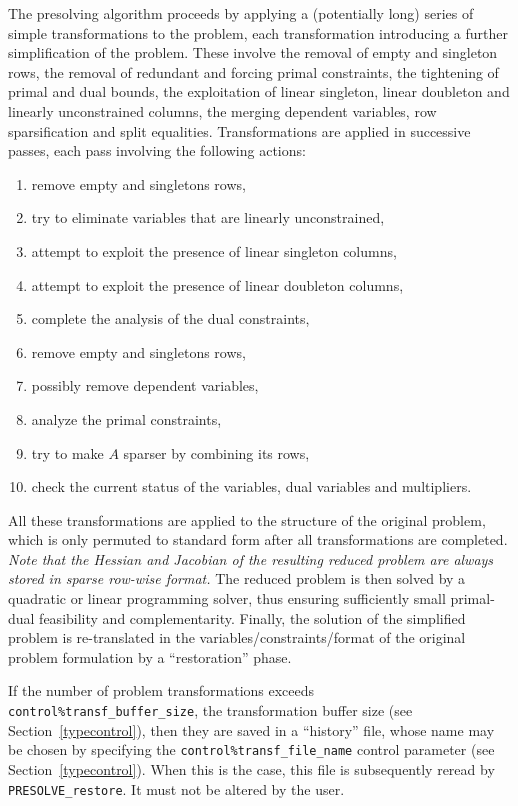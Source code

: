 \documentclass{galahad}
\newcommand{\packagename}{PRESOLVE}
\begin{document}
The presolving algorithm proceeds by applying a (potentially long) series of
simple transformations to the problem, each transformation introducing a
further simplification of the problem. These involve the removal of empty and
singleton rows, the removal of redundant and forcing primal constraints, the
tightening of primal and dual bounds, the exploitation of linear singleton,
linear doubleton and linearly unconstrained columns, the merging dependent
variables, row sparsification and split equalities. Transformations are
applied in successive passes, each pass involving the following actions:
\begin{enumerate}
\item remove empty and singletons rows,
\item try to eliminate variables that are linearly unconstrained,
\item attempt to exploit the presence of linear singleton columns,
\item attempt to exploit the presence of linear doubleton columns,
\item complete the analysis of the dual constraints,
\item remove empty and singletons rows, 
\item possibly remove dependent variables,
\item analyze the primal constraints, 
\item try to make $A$ sparser by combining its rows,
\item check the current status of the variables, dual variables
      and multipliers.
\end{enumerate}
All these transformations are applied to the structure of the original
problem, which is only permuted to standard form after all transformations are
completed. \emph{Note that the Hessian and Jacobian of the resulting reduced
problem are always stored in sparse row-wise format.} The reduced problem is
then solved by a quadratic or linear programming solver, thus ensuring
sufficiently small primal-dual feasibility and complementarity. Finally, the
solution of the simplified problem is re-translated in the
variables/constraints/format of the original problem formulation by a
``restoration'' phase.

If the number of problem transformations exceeds {\tt
control\%transf\_buffer\_size},  the transformation buffer size (see
Section~\ref{typecontrol}), then they are saved in a ``history'' file, whose
name may be chosen by specifying the {\tt control\%transf\_file\_name} control
parameter (see Section~\ref{typecontrol}).  When this is the case, this file
is subsequently reread by {\tt \packagename\_restore}. It must not be altered
by the user.
\end{document}
